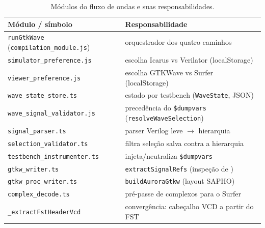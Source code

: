 \begin{table}[h]
\centering
\begin{tabularx}{\linewidth}{Y Z}
\toprule
\textbf{Módulo / símbolo} & \textbf{Responsabilidade} \\
\midrule
\lstinline|runGtkWave| (\lstinline|compilation_module.js|) & orquestrador dos quatro caminhos \\
\lstinline|simulator_preference.js| & escolha Icarus vs Verilator (localStorage) \\
\lstinline|viewer_preference.js| & escolha GTKWave vs Surfer (localStorage) \\
\lstinline|wave_state_store.ts| & estado por testbench (\lstinline|WaveState|, JSON) \\
\lstinline|wave_signal_validator.js| & precedência do \lstinline|$dumpvars| (\lstinline|resolveWaveSelection|) \\
\lstinline|signal_parser.ts| & parser Verilog leve $\rightarrow$ hierarquia \\
\lstinline|selection_validator.ts| & filtra seleção salva contra a hierarquia \\
\lstinline|testbench_instrumenter.ts| & injeta/neutraliza \lstinline|$dumpvars| \\
\lstinline|gtkw_writer.ts| & \lstinline|extractSignalRefs| (inspeção de ) \\
\lstinline|gtkw_proc_writer.ts| & \lstinline|buildAuroraGtkw| (layout SAPHO) \\
\lstinline|complex_decode.ts| & pré-passe de complexos para o Surfer \\
\lstinline|_extractFstHeaderVcd| & convergência: cabeçalho VCD a partir do FST \\
\bottomrule
\end{tabularx}
\caption{Módulos do fluxo de ondas e suas responsabilidades.}
\label{tab:09-resumo-modulos}
\end{table}
